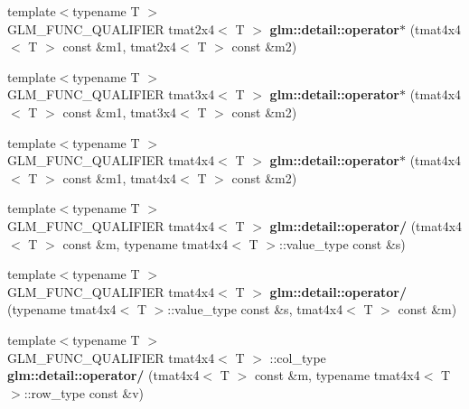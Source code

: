 \begin{DoxyCompactItemize}
\item 
\hypertarget{namespaceglm_1_1detail_a9ffe734881cad285ce8be6f50b225dd6}{{\footnotesize template$<$typename T $>$ }\\\-G\-L\-M\-\_\-\-F\-U\-N\-C\-\_\-\-Q\-U\-A\-L\-I\-F\-I\-E\-R tmat2x4$<$ \-T $>$ {\bfseries glm\-::detail\-::operator$\ast$} (tmat4x4$<$ \-T $>$ const \&m1, tmat2x4$<$ \-T $>$ const \&m2)}\label{namespaceglm_1_1detail_a9ffe734881cad285ce8be6f50b225dd6}

\item 
\hypertarget{namespaceglm_1_1detail_ad6d969daf73291b215cd460150306857}{{\footnotesize template$<$typename T $>$ }\\\-G\-L\-M\-\_\-\-F\-U\-N\-C\-\_\-\-Q\-U\-A\-L\-I\-F\-I\-E\-R tmat3x4$<$ \-T $>$ {\bfseries glm\-::detail\-::operator$\ast$} (tmat4x4$<$ \-T $>$ const \&m1, tmat3x4$<$ \-T $>$ const \&m2)}\label{namespaceglm_1_1detail_ad6d969daf73291b215cd460150306857}

\item 
\hypertarget{namespaceglm_1_1detail_a35c87764ddeb928087a04465e14f732b}{{\footnotesize template$<$typename T $>$ }\\\-G\-L\-M\-\_\-\-F\-U\-N\-C\-\_\-\-Q\-U\-A\-L\-I\-F\-I\-E\-R tmat4x4$<$ \-T $>$ {\bfseries glm\-::detail\-::operator$\ast$} (tmat4x4$<$ \-T $>$ const \&m1, tmat4x4$<$ \-T $>$ const \&m2)}\label{namespaceglm_1_1detail_a35c87764ddeb928087a04465e14f732b}

\item 
\hypertarget{namespaceglm_1_1detail_a45028fc42b0b726fd694f154549e0fba}{{\footnotesize template$<$typename T $>$ }\\\-G\-L\-M\-\_\-\-F\-U\-N\-C\-\_\-\-Q\-U\-A\-L\-I\-F\-I\-E\-R tmat4x4$<$ \-T $>$ {\bfseries glm\-::detail\-::operator/} (tmat4x4$<$ \-T $>$ const \&m, typename tmat4x4$<$ \-T $>$\-::value\-\_\-type const \&s)}\label{namespaceglm_1_1detail_a45028fc42b0b726fd694f154549e0fba}

\item 
\hypertarget{namespaceglm_1_1detail_a36ef07e879cd9ff478300d31e1119228}{{\footnotesize template$<$typename T $>$ }\\\-G\-L\-M\-\_\-\-F\-U\-N\-C\-\_\-\-Q\-U\-A\-L\-I\-F\-I\-E\-R tmat4x4$<$ \-T $>$ {\bfseries glm\-::detail\-::operator/} (typename tmat4x4$<$ \-T $>$\-::value\-\_\-type const \&s, tmat4x4$<$ \-T $>$ const \&m)}\label{namespaceglm_1_1detail_a36ef07e879cd9ff478300d31e1119228}

\item 
\hypertarget{namespaceglm_1_1detail_ab61569f90e0a8261a3c42fb50803b220}{{\footnotesize template$<$typename T $>$ }\\\-G\-L\-M\-\_\-\-F\-U\-N\-C\-\_\-\-Q\-U\-A\-L\-I\-F\-I\-E\-R tmat4x4$<$ \-T $>$\*
\-::col\-\_\-type {\bfseries glm\-::detail\-::operator/} (tmat4x4$<$ \-T $>$ const \&m, typename tmat4x4$<$ \-T $>$\-::row\-\_\-type const \&v)}\label{namespaceglm_1_1detail_ab61569f90e0a8261a3c42fb50803b220}


\end{DoxyCompactItemize}
